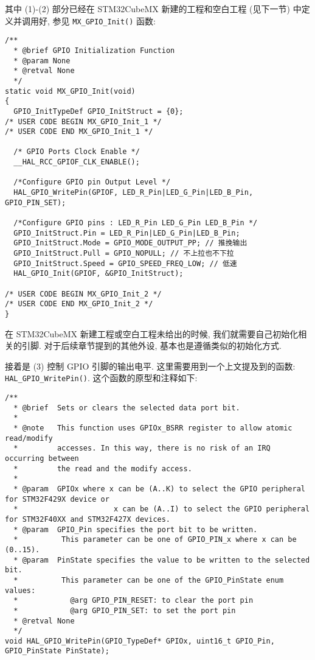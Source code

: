 其中 (1)-(2) 部分已经在 STM32CubeMX 新建的工程和空白工程 (见下一节) 中定义并调用好, 参见 \texttt{MX\_GPIO\_Init()} 函数:

\begin{verbatim}
/**
  * @brief GPIO Initialization Function
  * @param None
  * @retval None
  */
static void MX_GPIO_Init(void)
{
  GPIO_InitTypeDef GPIO_InitStruct = {0};
/* USER CODE BEGIN MX_GPIO_Init_1 */
/* USER CODE END MX_GPIO_Init_1 */

  /* GPIO Ports Clock Enable */
  __HAL_RCC_GPIOF_CLK_ENABLE();

  /*Configure GPIO pin Output Level */
  HAL_GPIO_WritePin(GPIOF, LED_R_Pin|LED_G_Pin|LED_B_Pin, GPIO_PIN_SET);

  /*Configure GPIO pins : LED_R_Pin LED_G_Pin LED_B_Pin */
  GPIO_InitStruct.Pin = LED_R_Pin|LED_G_Pin|LED_B_Pin;
  GPIO_InitStruct.Mode = GPIO_MODE_OUTPUT_PP; // 推挽输出
  GPIO_InitStruct.Pull = GPIO_NOPULL; // 不上拉也不下拉
  GPIO_InitStruct.Speed = GPIO_SPEED_FREQ_LOW; // 低速
  HAL_GPIO_Init(GPIOF, &GPIO_InitStruct);

/* USER CODE BEGIN MX_GPIO_Init_2 */
/* USER CODE END MX_GPIO_Init_2 */
}
\end{verbatim}

在 STM32CubeMX 新建工程或空白工程未给出的时候, 我们就需要自己初始化相关的引脚. 对于后续章节提到的其他外设, 基本也是遵循类似的初始化方式.

接着是 (3) 控制 GPIO 引脚的输出电平. 这里需要用到一个上文提及到的函数: \texttt{HAL\_GPIO\_WritePin()}. 这个函数的原型和注释如下:

\begin{verbatim}
/**
  * @brief  Sets or clears the selected data port bit.
  *
  * @note   This function uses GPIOx_BSRR register to allow atomic read/modify
  *         accesses. In this way, there is no risk of an IRQ occurring between
  *         the read and the modify access.
  *
  * @param  GPIOx where x can be (A..K) to select the GPIO peripheral for STM32F429X device or
  *                      x can be (A..I) to select the GPIO peripheral for STM32F40XX and STM32F427X devices.
  * @param  GPIO_Pin specifies the port bit to be written.
  *          This parameter can be one of GPIO_PIN_x where x can be (0..15).
  * @param  PinState specifies the value to be written to the selected bit.
  *          This parameter can be one of the GPIO_PinState enum values:
  *            @arg GPIO_PIN_RESET: to clear the port pin
  *            @arg GPIO_PIN_SET: to set the port pin
  * @retval None
  */
void HAL_GPIO_WritePin(GPIO_TypeDef* GPIOx, uint16_t GPIO_Pin, GPIO_PinState PinState);
\end{verbatim}

